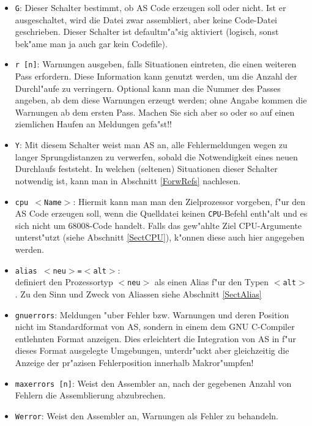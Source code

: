 \documentclass[12pt,a4paper,twoside]{report}
\newcommand{\tty}[1]{{\tt #1}}
\begin{document}
\begin{itemize}
\item{\tty{G}: Dieser Schalter bestimmt, ob AS Code erzeugen soll oder nicht.
      Ist er ausgeschaltet, wird die Datei zwar assembliert,
      aber keine Code-Datei geschrieben. Dieser Schalter ist defaultm"a"sig aktiviert
      (logisch, sonst bek"ame man ja auch gar kein Codefile).}
\item{\tty{r [n]}: Warnungen ausgeben, falls Situationen eintreten, die
      einen weiteren Pass erfordern.  Diese Information kann genutzt
      werden, um die Anzahl der Durchl"aufe zu verringern.  Optional kann
      man die Nummer des Passes angeben, ab dem diese Warnungen erzeugt
      werden; ohne Angabe kommen die Warnungen ab dem ersten Pass.  Machen
      Sie sich aber so oder so auf einen ziemlichen Haufen an Meldungen
      gefa"st!!}
\item{\tty{Y}: Mit diesem Schalter weist man AS an, alle Fehlermeldungen
      wegen zu langer Sprungdistanzen zu verwerfen, sobald die Notwendigkeit
      eines neuen Durchlaufs feststeht.  In welchen (seltenen) Situationen
      dieser Schalter notwendig ist, kann man in Abschnitt \ref{ForwRefs}
      nachlesen.}
\item{\tty{cpu $<$Name$>$}: Hiermit kann man man den Zielprozessor
      vorgeben, f"ur den AS Code erzeugen soll, wenn die Quelldatei keinen
      {\tt CPU}-Befehl enth"alt und es sich nicht um 68008-Code handelt.
      Falls das gew"ahlte Ziel CPU-Argumente unterst"utzt (siehe Abschnitt
      \ref{SectCPU}), k"onnen diese auch hier angegeben werden.}
\item{\tty{alias $<$neu$>$=$<$alt$>$}:\\
      definiert den Prozessortyp \tty{$<$neu$>$} als einen Alias f"ur den
      Typen \tty{$<$alt$>$}.  Zu den Sinn und Zweck von Aliassen siehe
      Abschnitt \ref{SectAlias}}
\item{{\tt gnuerrors}: Meldungen "uber Fehler bzw. Warnungen und deren
      Position nicht im Standardformat von AS, sondern in einem dem GNU
      C-Compiler entlehnten Format anzeigen.  Dies erleichtert die
      Integration von AS in f"ur dieses Format ausgelegte Umgebungen,
      unterdr"uckt aber gleichzeitig die Anzeige der pr"azisen
      Fehlerposition innerhalb Makror"umpfen!}
\item{{\tt maxerrors [n]}: Weist den Assembler an, nach der gegebenen
      Anzahl von Fehlern die Assemblierung abzubrechen.}
\item{{\tt Werror}: Weist den Assembler an, Warnungen als Fehler zu
      behandeln.}
\end{itemize}
\end{document}
